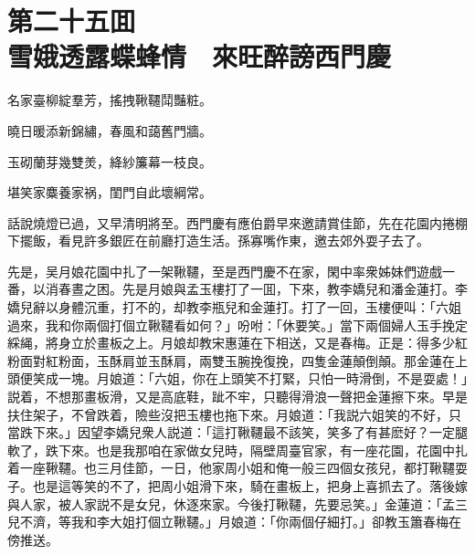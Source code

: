 
\chapter*{第二十五囬　\\雪娥透露蝶蜂情　來旺醉謗西門慶}


\begin{myquote}
名家臺柳綻羣芳，搖拽鞦韆鬦豔粧。

曉日暖添新錦繡，春風和藹舊門牆。

玉砌蘭芽幾雙羙，絳紗簾幕一枝良。

堪笑家麋養家祸，閨門自此壞綱常。
\end{myquote}

話說燒燈已過，又早清明將至。西門慶有應伯爵早來邀請賞佳節，先在花園内捲棚下擺飯，看見許多銀匠在前廳打造生活。孫寡嘴作東，邀去郊外耍子去了。

先是，吴月娘花園中扎了一架鞦韆，至是西門慶不在家，閑中率衆姊妹們遊戲一番，以消春晝之困。先是月娘與孟玉樓打了一囬，下來，教李嬌兒和潘金蓮打。李嬌兒辭以身體沉重，打不的，却教李瓶兒和金蓮打。打了一回，玉樓便叫：「六姐過來，我和你兩個打個立鞦韆看如何？」吩咐：「休要笑。」當下兩個婦人玉手挽定綵䋲，將身立於畫板之上。月娘却教宋惠蓮在下相送，又是春梅。正是：得多少紅粉面對紅粉面，玉酥肩並玉酥肩，兩雙玉腕挽復挽，四隻金蓮顛倒顛。那金蓮在上頭便笑成一塊。月娘道：「六姐，你在上頭笑不打緊，只怕一時滑倒，不是耍處！」説着，不想那畫板滑，又是高底鞋，跐不牢，只聽得滑浪一聲把金蓮擦下來。早是扶住架子，不曾跌着，險些沒把玉樓也拖下來。月娘道：「我説六姐笑的不好，只當跌下來。」因望李嬌兒衆人説道：「這打鞦韆最不該笑，笑多了有甚麽好？一定腿軟了，跌下來。也是我那咱在家做女兒時，隔壁周臺官家，有一座花園，花園中扎着一座鞦韆。也三月佳節，一日，他家周小姐和俺一般三四個女孩兒，都打鞦韆耍子。也是這等笑的不了，把周小姐滑下來，騎在畫板上，把身上喜抓去了。落後嫁與人家，被人家説不是女兒，休逐來家。今後打鞦韆，先要忌笑。」金蓮道：「孟三兒不濟，等我和李大姐打個立鞦韆。」月娘道：「你兩個仔細打。」卻教玉簫春梅在傍推送。

